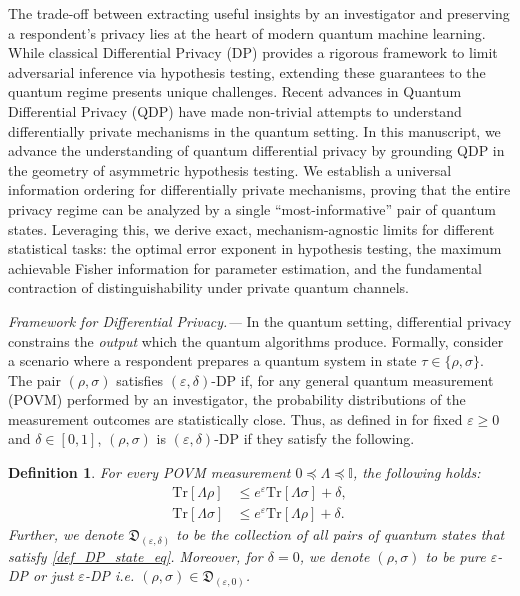 \documentclass[onecolumn,ldraftcls, 11pt]{IEEEtran}
\newcommand{\tr}{\mathrm{Tr}}
\newcommand{\eps}{\varepsilon}
\newtheorem{definition}{Definition}
\begin{document}
The trade-off between extracting useful insights by an investigator and preserving a respondent's privacy lies at the heart of modern quantum machine learning. While classical Differential Privacy (DP) \cite{dwork2006calibrating,dwork2006} provides a rigorous framework to limit adversarial inference via hypothesis testing, extending these guarantees to the quantum regime presents unique challenges. Recent advances in Quantum Differential Privacy (QDP) \cite{ZY2017} have made non-trivial attempts \cite{DHLTL21,HRF23,AK25,Nuradha24,Nuradha25} to understand differentially private mechanisms in the quantum setting. In this manuscript, we advance the understanding of quantum differential privacy by grounding QDP in the geometry of asymmetric hypothesis testing. We establish a universal information ordering for differentially private mechanisms, proving that the entire privacy regime can be analyzed by a single ``most-informative'' pair of quantum states. Leveraging this, we derive exact, mechanism-agnostic limits for different statistical tasks: the optimal error exponent in hypothesis testing, the maximum achievable Fisher information for parameter estimation, and the fundamental contraction of distinguishability under private quantum channels.


{\em Framework for Differential Privacy.---}
In the quantum setting, differential privacy constrains the \emph{output} which the quantum algorithms produce. Formally, consider a scenario where a respondent prepares a quantum system in state $\tau \in \{\rho, \sigma\}$. The pair $(\rho, \sigma)$ satisfies $(\eps, \delta)$-DP if, for any general quantum measurement (POVM) performed by an investigator, the probability distributions of the measurement outcomes are statistically close. Thus, as defined in \cite{ZY2017} for fixed $\eps \geq 0$ and $\delta \in [0,1]$, $(\rho, \sigma)$ is $(\eps, \delta)$-DP if they satisfy the following.
\begin{definition}\label{def_DP_state}
   For every POVM measurement $0 \preceq \Lambda \preceq \mathbb{I}$, the following holds:
    \begin{equation}
        \begin{split}
            \tr[\Lambda \rho] &\leq e^{\eps} \tr[\Lambda \sigma]+ \delta,\\
        \tr[\Lambda \sigma] &\leq e^{\eps} \tr[\Lambda \rho]+ \delta.
        \end{split}\label{def_DP_state_eq}
    \end{equation}
    Further, we denote $\mathfrak{D}_{(\eps,\delta)}$ to be the collection of all pairs of quantum states that satisfy \eqref{def_DP_state_eq}. Moreover, for $\delta = 0$, we denote $(\rho,\sigma)$ to be pure $\eps$-DP or just $\eps$-DP i.e. $(\rho,\sigma) \in \mathfrak{D}_{(\eps,0)}$.
\end{definition}
\end{document}
